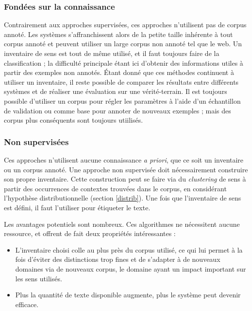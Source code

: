 \subsubsection{Fondées sur la connaissance}

Contrairement aux approches supervisées, ces approches n'utilisent pas de
corpus annoté. Les systèmes s'affranchissent alors de la petite taille
inhérente à tout corpus annoté et peuvent utiliser un large corpus non annoté
tel que le web. Un inventaire de sens est tout de même utilisé, et il faut
toujours faire de la classification ; la difficulté principale étant ici
d'obtenir des informations utiles à partir des exemples non annotés. Étant
donné que ces méthodes continuent à utiliser un inventaire, il reste possible
de comparer les résultats entre différents systèmes et de réaliser une
évaluation sur une vérité-terrain. Il est toujours possible d'utiliser un
corpus pour régler les paramètres à l'aide d'un échantillon de validation ou
comme base pour annoter de nouveaux exemples ; mais des corpus plus conséquents
sont toujours utiilisés.

\subsubsection{Non supervisées}

Ces approches n'utilisent aucune connaissance \textit{a priori}, que ce soit un
inventaire ou un corpus annoté. Une approche non supervisée doit nécessairement
construire son propre inventaire. Cette construction peut se faire via du
\textit{clustering} de sens à partir des occurrences de contextes trouvées dans
le corpus, en considérant l'hypothèse distributionnelle (section
\ref{distrib}). Une fois que l'inventaire de sens est défini, il faut
l'utiliser pour étiqueter le texte.

Les avantages potentiels sont nombreux. Ces algorithmes ne nécessitent aucune
ressource, et offrent de fait deux propriétés intéressantes :

\begin{itemize}

    \item L'inventaire choisi colle au plus près du corpus utilisé, ce qui lui
        permet à la fois d'éviter des distinctions trop fines et de s'adapter à
        de nouveaux domaines via de nouveaux corpus, le domaine ayant un impact
        important sur les sens utilisés.

    \item Plus la quantité de texte disponible augmente, plus le système peut
        devenir efficace.

\end{itemize}

